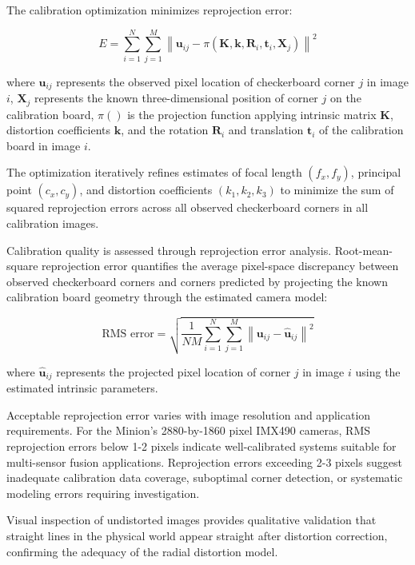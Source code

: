\documentclass{erauthesis}
\begin{document}
The calibration optimization minimizes reprojection error:

\begin{equation}
    E = \sum_{i=1}^{N} \sum_{j=1}^{M} \left\| \mathbf{u}_{ij} - \pi(\mathbf{K}, \mathbf{k}, \mathbf{R}_i, \mathbf{t}_i, \mathbf{X}_j) \right\|^2
\end{equation}


where $\mathbf{u}_{ij}$ represents the observed pixel location of checkerboard corner $j$ in image $i$, $\mathbf{X}_j$ represents the known three-dimensional position of corner $j$ on the calibration board, $\pi()$ is the projection function applying intrinsic matrix $\mathbf{K}$, distortion coefficients $\mathbf{k}$, and the rotation $\mathbf{R}_i$ and translation $\mathbf{t}_i$ of the calibration board in image $i$.

The optimization iteratively refines estimates of focal length $(f_x, f_y)$, principal point $(c_x, c_y)$, and distortion coefficients $(k_1, k_2, k_3)$ to minimize the sum of squared reprojection errors across all observed checkerboard corners in all calibration images.


Calibration quality is assessed through reprojection error analysis.
Root-mean-square reprojection error quantifies the average pixel-space discrepancy between observed checkerboard corners and corners predicted by projecting the known calibration board geometry through the estimated camera model:

$$\text{RMS error} = \sqrt{\frac{1}{NM}\sum_{i=1}^{N} \sum_{j=1}^{M} \left\| \mathbf{u}_{ij} - \hat{\mathbf{u}}_{ij} \right\|^2}$$

where $\hat{\mathbf{u}}_{ij}$ represents the projected pixel location of corner $j$ in image $i$ using the estimated intrinsic parameters.

Acceptable reprojection error varies with image resolution and application requirements.
For the Minion's 2880-by-1860 pixel IMX490 cameras, RMS reprojection errors below 1-2 pixels indicate well-calibrated systems suitable for multi-sensor fusion applications.
Reprojection errors exceeding 2-3 pixels suggest inadequate calibration data coverage, suboptimal corner detection, or systematic modeling errors requiring investigation.

Visual inspection of undistorted images provides qualitative validation that straight lines in the physical world appear straight after distortion correction, confirming the adequacy of the radial distortion model.
\end{document}
